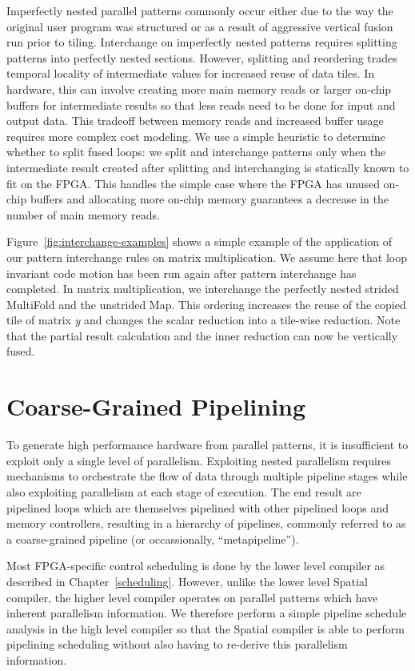 Imperfectly nested parallel patterns commonly occur either due to the way the original user program was structured or
as a result of aggressive vertical fusion run prior to tiling.
Interchange on imperfectly nested patterns requires splitting patterns into perfectly nested sections. However, splitting and reordering trades
temporal locality of intermediate values for increased reuse of data tiles. In hardware, this can involve creating more main memory
reads or larger on-chip buffers for intermediate results so that less reads need to be done for input and output data. This tradeoff between memory reads and
increased buffer usage requires more complex cost modeling.
We use a simple heuristic to determine whether to split fused loops: we split and interchange patterns only when
the intermediate result created after splitting and interchanging is statically known to fit on the FPGA. This handles the simple case
where the FPGA has unused on-chip buffers and allocating more on-chip memory guarantees a decrease in the number of main memory reads.

Figure~\ref{fig:interchange-examples} shows a simple example of the application of our pattern interchange rules on matrix multiplication.
We assume here that loop invariant code motion has been run again after pattern interchange has completed.
In matrix multiplication, we interchange the perfectly nested strided MultiFold and the unstrided Map.
This ordering increases the reuse of the copied tile of matrix \emph{y} and changes the scalar reduction into a tile-wise reduction.
Note that the partial result calculation and the inner reduction can now be vertically fused.

\section{Coarse-Grained Pipelining}
To generate high performance hardware from parallel patterns, it is insufficient
to exploit only a single level of parallelism. Exploiting nested parallelism
requires mechanisms to orchestrate the flow of data through multiple pipeline
stages while also exploiting parallelism at each stage of execution.
The end result are pipelined loops which are themselves pipelined with other
pipelined loops and memory controllers, resulting in a hierarchy of pipelines,
commonly referred to as a coarse-grained pipeline (or occassionally, ``metapipeline'').

Most FPGA-specific control scheduling is done by the lower level compiler as described in Chapter~\ref{scheduling}. However, unlike the lower level Spatial compiler, the higher level
compiler operates on parallel patterns which have inherent parallelism information.
We therefore perform a simple pipeline schedule analysis in the high level compiler
so that the Spatial compiler is able to perform pipelining scheduling without
also having to re-derive this parallelism information.

